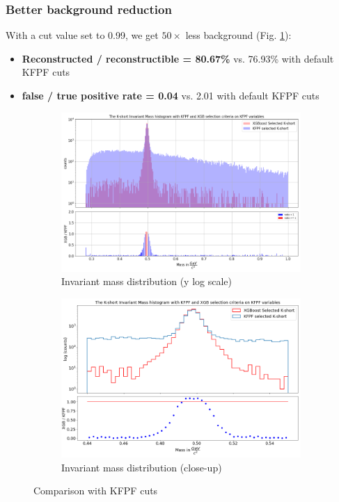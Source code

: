 \documentclass[12pt,a4paper]{report}
\begin{document}
\subsubsection{Better background reduction}
With a cut value set to 0.99, we get $50\times$ less background (Fig. \ref{bckgr}):
\begin{itemize}
    \item \textbf{Reconstructed \PKshort / reconstructible \PKshort = 80.67\%}  vs. 76.93\% with default KFPF cuts
    \item \textbf{false / true positive rate = 0.04} vs. 2.01 with default KFPF cuts
\end{itemize}
\begin{figure}
 \centering
    \begin{subfigure}[b]{0.99\linewidth} 
        \centering
        \includegraphics[width=\textwidth]{images/better_reduction1.png} 
        \caption{Invariant mass distribution (y log scale)} 
        \vspace{0.3cm}
    \end{subfigure}
     \hfill
       \begin{subfigure}[b]{0.99\linewidth}
        \centering
        \includegraphics[width=\textwidth]{images/better_reduction2.png} 
        \caption{Invariant mass distribution (close-up)}
        \vspace{0.3cm}
    \end{subfigure}
    \caption{Comparison with KFPF cuts}\label{bckgr}
\end{figure}
\end{document}

